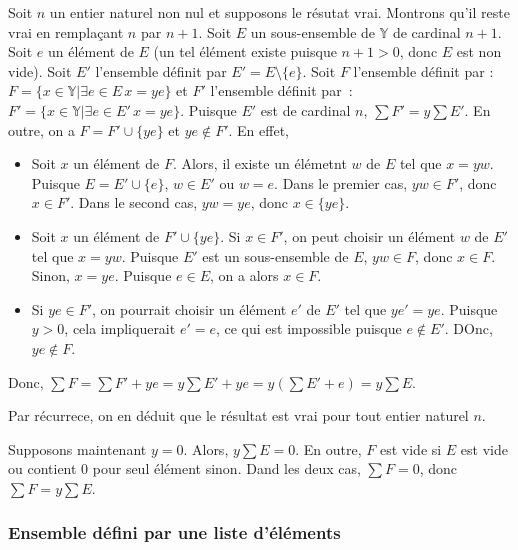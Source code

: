     Soit $n$ un entier naturel non nul et supposons le résutat vrai. 
    Montrons qu'il reste vrai en remplaçant $n$ par $n+1$. 
    Soit $E$ un sous-ensemble de $\mathbb{Y}$ de cardinal $n+1$. 
    Soit $e$ un élément de $E$ (un tel élément existe puisque $n+1 > 0$, donc $E$ est non vide).
    Soit $E'$ l'ensemble définit par $E' = E \setminus \lbrace e \rbrace$. 
    Soit $F$ l'ensemble définit par : $F = \lbrace x \in \mathbb{Y} \vert \exists e \in E \, x = y e \rbrace$ et $F'$ l'ensemble définit par : $F' = \lbrace x \in \mathbb{Y} \vert \exists e \in E' \, x = y e \rbrace$.
    Puisque $E'$ est de cardinal $n$, $\sum F' = y \sum E'$.
    En outre, on a $F = F' \cup \lbrace y e \rbrace$ et $y e \notin F'$.
    En effet, 
    \begin{itemize}[nosep]
        \item Soit $x$ un élément de $F$.
            Alors, il existe un élémetnt $w$ de $E$ tel que $x = y w$.
            Puisque $E = E' \cup \lbrace e \rbrace$, $w \in E'$ ou $w = e$.
            Dans le premier cas, $y w \in F'$, donc $x \in F'$.
            Dans le second cas, $y w = y e$, donc $x \in \lbrace y e \rbrace$.
        \item Soit $x$ un élément de $F' \cup \lbrace y e \rbrace$. 
            Si $x \in F'$, on peut choisir un élément $w$ de $E'$ tel que $x = y w$.
            Puisque $E'$ est un sous-ensemble de $E$, $y w \in F$, donc $x \in F$.
            Sinon, $x = y e$.
            Puisque $e \in E$, on a alors $x \in F$.
        \item Si $y e \in F'$, on pourrait choisir un élément $e'$ de $E'$ tel que $y e' = y e$.
            Puisque $y > 0$, cela impliquerait $e' = e$, ce qui est impossible puisque $e \notin E'$.
            DOnc, $ye \notin F$.
    \end{itemize}
    Donc, $\sum F = \sum F' + y e = y \sum E' + y e = y (\sum E' + e) = y \sum E$.

    Par récurrece, on en déduit que le résultat est vrai pour tout entier naturel $n$.

    Supposons maintenant $y = 0$.
    Alors, $y \sum E = 0$.
    En outre, $F$ est vide si $E$ est vide ou contient $0$ pour seul élément sinon.
    Dand les deux cas, $\sum F = 0$, donc $\sum F = y \sum E$.

    \done

\subsubsection{Ensemble défini par une liste d'éléments} 

